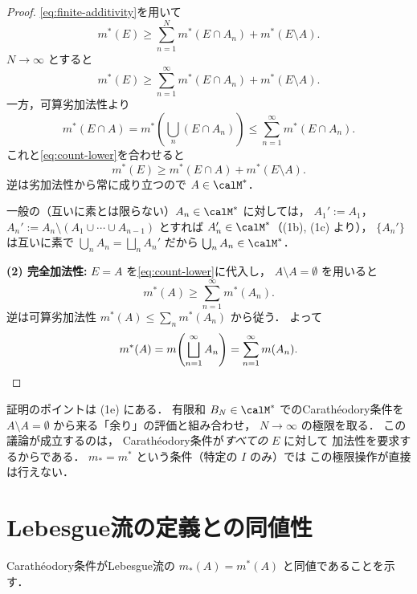 \begin{proof}
\eqref{eq:finite-additivity}を用いて
\[
m^*(E) \ge \sum_{n=1}^{N} m^*(E \cap A_n) + m^*(E \setminus A).
\]
$N \to \infty$ とすると
\begin{equation}\label{eq:count-lower}
m^*(E) \ge \sum_{n=1}^{\infty} m^*(E \cap A_n) + m^*(E \setminus A).
\end{equation}
一方，可算劣加法性より
\[
m^*(E \cap A)
= m^*\!\left(\bigcup_n (E \cap A_n)\right)
\le \sum_{n=1}^{\infty} m^*(E \cap A_n).
\]
これと\eqref{eq:count-lower}を合わせると
\[
m^*(E) \ge m^*(E \cap A) + m^*(E \setminus A).
\]
逆は劣加法性から常に成り立つので $A \in \calM^*$．

一般の（互いに素とは限らない）$A_n \in \calM^*$ に対しては，
$A_1' := A_1$，
$A_n' := A_n \setminus (A_1 \cup \cdots \cup A_{n-1})$
とすれば $A_n' \in \calM^*$（(1b), (1c) より），
$\{A_n'\}$ は互いに素で
$\bigcup_n A_n = \bigsqcup_n A_n'$ だから
$\bigcup_n A_n \in \calM^*$．

\bigskip

\textbf{(2) 完全加法性:}\quad
$E = A$ を\eqref{eq:count-lower}に代入し，
$A \setminus A = \emptyset$ を用いると
\[
m^*(A) \ge \sum_{n=1}^{\infty} m^*(A_n).
\]
逆は可算劣加法性 $m^*(A) \le \sum_n m^*(A_n)$ から従う．
よって
\[
m^*(A) = m\!\left(\bigsqcup_{n=1}^{\infty} A_n\right)
= \sum_{n=1}^{\infty} m(A_n). \qedhere
\]
\end{proof}

\begin{remark}
証明のポイントは (1e) にある．
有限和 $B_N \in \calM^*$ でのCarath\'eodory条件を
$A \setminus A = \emptyset$ から来る「余り」の評価と組み合わせ，
$N \to \infty$ の極限を取る．
この議論が成立するのは，
Carath\'eodory条件が\emph{すべての} $E$ に対して
加法性を要求するからである．
$m_* = m^*$ という条件（特定の $I$ のみ）では
この極限操作が直接は行えない．
\end{remark}

\section{Lebesgue流の定義との同値性}\label{sec:caratheodory-equiv}

Carath\'eodory条件がLebesgue流の
$m_*(A) = m^*(A)$ と同値であることを示す．

